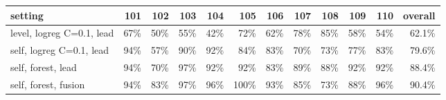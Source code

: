 \begin{adjustbox}{max width=\textwidth}
{\footnotesize
\begin{tabular}{lrrrrrrrrrrr}
\toprule
\textbf{setting} & \textbf{101} & \textbf{102} & \textbf{103} & \textbf{104} & \textbf{105} & \textbf{106} & \textbf{107} & \textbf{108} & \textbf{109} & \textbf{110} & \textbf{overall} \\
\midrule
level, logreg C=0.1, lead & 67\% & 50\% & 55\% & 42\% & 72\% & 62\% & 78\% & 85\% & 58\% & 54\% & 62.1\% \\
self, logreg C=0.1, lead & 94\% & 57\% & 90\% & 92\% & 84\% & 83\% & 70\% & 73\% & 77\% & 83\% & 79.6\% \\
self, forest, lead & 94\% & 70\% & 97\% & 92\% & 92\% & 83\% & 89\% & 88\% & 92\% & 92\% & 88.4\% \\
self, forest, fusion & 94\% & 83\% & 97\% & 96\% & 100\% & 93\% & 85\% & 73\% & 88\% & 96\% & 90.4\% \\
\bottomrule
\end{tabular}
}
\end{adjustbox}
